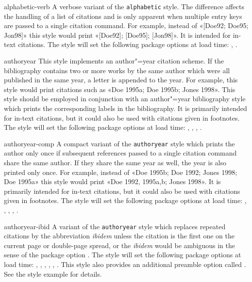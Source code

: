 \documentclass{ltxdockit}[2011/03/25]
\begin{document}
\begin{marglist}
\item[alphabetic-verb]
A verbose variant of the \texttt{alphabetic} style. The difference affects the handling of a list of citations and is only apparent when multiple entry keys are passed to a single citation command. For example, instead of «[Doe92; Doe95; Jon98]» this style would print «[Doe92]; [Doe95]; [Jon98]». It is intended for in-text citations. The style will set the following package options at load time: , .

\item[authoryear]
This style implements an author"=year citation scheme. If the bibliography contains two or more works by the same author which were all published in the same year, a letter is appended to the year. For example, this style would print citations such as «Doe 1995a; Doe 1995b; Jones 1998». This style should be employed in conjunction with an author"=year bibliography style which prints the corresponding labels in the bibliography. It is primarily intended for in-text citations, but it could also be used with citations given in footnotes. The style will set the following package options at load time: , , , .

\item[authoryear-comp]
A compact variant of the \texttt{authoryear} style which prints the author only once if subsequent references passed to a single citation command share the same author. If they share the same year as well, the year is also printed only once. For example, instead of «Doe 1995b; Doe 1992; Jones 1998; Doe 1995a» this style would print «Doe 1992, 1995a,b; Jones 1998». It is primarily intended for in-text citations, but it could also be used with citations given in footnotes. The style will set the following package options at load time: , , , , .

\item[authoryear-ibid]
A variant of the \texttt{authoryear} style which replaces repeated citations by the abbreviation \emph{ibidem} unless the citation is the first one on the current page or double-page spread, or the \emph{ibidem} would be ambiguous in the sense of the package option . The style will set the following package options at load time: , , , , , . This style also provides an additional preamble option called . See the style example for details.


\end{marglist}
\end{document}
